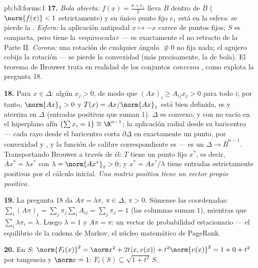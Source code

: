 \begin{solution}{pb:b3:forms:1}
\textbf{17.} \emph{Bola abierta:} $f(x) = \frac{x + e_1}2$ lleva $B$
dentro de $B$ ($\norm{f(x)} < 1$ estrictamente) y su único punto fijo
$e_1$ está en la esfera: se pierde la . \emph{Esfera:} la
aplicación antipodal $x \mapsto -x$ carece de puntos fijos; $S$ es
compacta, pero tiene la
 «equivocada» --- es
exactamente el no retracto de la Parte II. \emph{Corona:} una rotación
de cualquier ángulo $\not\equiv 0$ no fija nada; el agujero cobija la
rotación --- se pierde la convexidad (más precisamente, la
 de bola). El teorema de
Brouwer trata en realidad de los conjuntos \emph{convexos
}, como explota la pregunta
18.

\textbf{18.} Para $x \in \Delta$: algún $x_j > 0$, de modo que $(Ax)_i
\geq A_{ij}x_j > 0$ para todo $i$; por tanto, $\norm{Ax}_1 > 0$ y
$T(x) = Ax/\norm{Ax}_1$ está bien definida, es
 y aterriza en $\Delta$
(entradas positivas que suman $1$). $\Delta$ es convexo,
 y con
 no vacío en el hiperplano
afín $\{\sum x_i = 1\} \cong \R^{n-1}$; la aplicación radial desde su
baricentro --- cada rayo desde el baricentro corta $\partial\Delta$ en
exactamente un punto, por convexidad y , y la función de
calibre correspondiente es 
--- es un  $\Delta \to
\bar B^{n-1}$. Transportando Brouwer a través de él: $T$ tiene un punto
fijo $x^*$, es decir, $Ax^* = \lambda x^*$ con $\lambda
= \norm{Ax^*}_1 > 0$; y $x^* = Ax^*/\lambda$ tiene entradas
estrictamente positivas por el cálculo inicial. \emph{Una matriz
positiva tiene un vector propio positivo.}

\textbf{19.} La pregunta 18 da $A\pi = \lambda\pi$, $\pi \in
\Delta$, $\pi > 0$. Súmense las coordenadas: $\sum_i(A\pi)_i =
\sum_j\pi_j\sum_iA_{ij} = \sum_j\pi_j = 1$ (las columnas suman $1$),
mientras que $\sum_i\lambda\pi_i = \lambda$. Luego $\lambda = 1$ y
$A\pi = \pi$: un vector de probabilidad estacionario --- el equilibrio
de la cadena de Markov, el núcleo matemático de PageRank.

\textbf{20.} En $S$: $\norm{F_t(x)}^2 = \norm x^2 +
2t\langle x, v(x)\rangle + t^2\norm{v(x)}^2 = 1 + 0 + t^2$ por tangencia
y $\norm v = 1$: $F_t(S) \subseteq
\sqrt{1+t^2}\,S$.


\end{solution}
